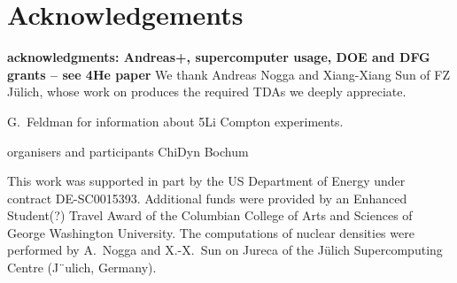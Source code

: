 \documentclass[a4paper,11pt]{article}
\newcommand{\com}[1]{\color{blue}\small\textbf{ #1 }\color{black}\normalsize}
\begin{document}
\section{Acknowledgements}
\com{acknowledgments: Andreas+, supercomputer usage, DOE and DFG grants -- see 4He paper}
We thank Andreas Nogga and Xiang-Xiang Sun of FZ J{\"u}lich, whose work on produces the required TDAs we 
deeply appreciate.

G.~Feldman for information about 5Li Compton experiments. 

organisers and participants ChiDyn Bochum

This
work was supported in part by the US Department of Energy under contract DE-SC0015393.
Additional
funds were provided by an Enhanced Student(?) Travel Award of the Columbian College of Arts and Sciences of George Washington University. The computations of
nuclear densities were performed by A.~Nogga and X.-X.~Sun on Jureca of the J{\"u}lich Supercomputing Centre (J¨ulich,
Germany).
\end{document}
